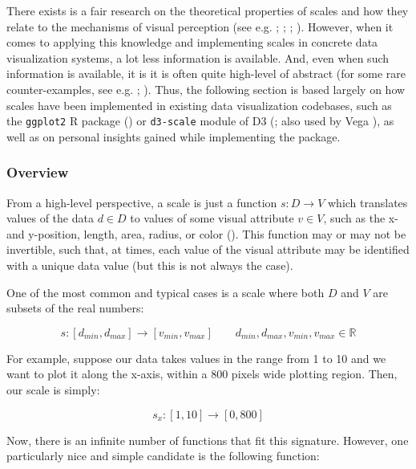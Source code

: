 \documentclass[
]{book}
\theoremstyle{definition}
\theoremstyle{definition}
\theoremstyle{definition}
\theoremstyle{definition}
\theoremstyle{remark}
\begin{document}
There exists is a fair research on the theoretical properties of scales and how they relate to the mechanisms of visual perception (see e.g. ; ; ; ). However, when it comes to applying this knowledge and implementing scales in concrete data visualization systems, a lot less information is available. And, even when such information is available, it is it is often quite high-level of abstract (for some rare counter-examples, see e.g. ; ). Thus, the following section is based largely on how scales have been implemented in existing data visualization codebases, such as the \texttt{ggplot2} R package () or \texttt{d3-scale} module of D3 (; also used by Vega ), as well as on personal insights gained while implementing the package.

\subsubsection{Overview}\label{overview}

From a high-level perspective, a scale is just a function \(s: D \to V\) which translates values of the data \(d \in D\) to values of some visual attribute \(v \in V\), such as the x- and y-position, length, area, radius, or color (). This function may or may not be invertible, such that, at times, each value of the visual attribute may be identified with a unique data value (but this is not always the case).

One of the most common and typical cases is a scale where both \(D\) and \(V\) are subsets of the real numbers:

\[s: [d_{min}, d_{max}] \to [v_{min}, v_{max}] \qquad d_{min}, d_{max}, v_{min}, v_{max} \in \mathbb{R}\]

For example, suppose our data takes values in the range from 1 to 10 and we want to plot it along the x-axis, within a 800 pixels wide plotting region. Then, our scale is simply:

\[s_x: [1, 10] \to [0, 800]\]

Now, there is an infinite number of functions that fit this signature. However, one particularly nice and simple candidate is the following function:
\end{document}
